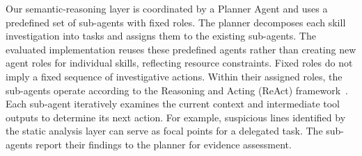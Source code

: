 %



Our semantic-reasoning layer is coordinated by a Planner
Agent and uses a predefined set of sub-agents with fixed
roles. The planner decomposes each skill investigation
into tasks and assigns them to the existing sub-agents.
The evaluated implementation reuses these predefined
agents rather than creating new agent roles for
individual skills, reflecting resource constraints.
Fixed roles do not imply a fixed sequence of investigative
actions. Within their assigned roles, the sub-agents
operate according to the Reasoning and Acting (ReAct)
framework~\cite{yao2023react}. Each sub-agent iteratively
examines the current context and intermediate tool
outputs to determine its next action.
For example, suspicious lines identified by the static
analysis layer can serve as focal points for a delegated
task. The sub-agents report their findings to the planner
for evidence assessment.

